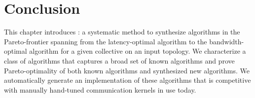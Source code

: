 \section{Conclusion}
This chapter introduces \tool: a systematic method to synthesize
algorithms in the Pareto-frontier spanning from the latency-optimal
algorithm to the bandwidth-optimal algorithm for a given collective on
an input topology. We characterize a class of algorithms that captures
a broad set of known algorithms and prove Pareto-optimality of both
known algorithms and synthesized new algorithms. We automatically
generate an implementation of these algorithms that is competitive
with manually hand-tuned communication kernels in use today.
